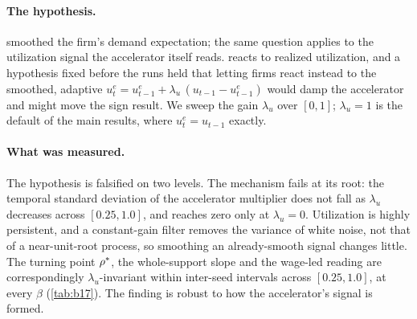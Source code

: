 \paragraph{The hypothesis.}  smoothed the firm's demand
expectation; the same question applies to the utilization signal the accelerator
itself reads.  reacts to realized utilization, and a
hypothesis fixed before the runs held that letting firms react instead to the
smoothed, adaptive $u^e_t = u^e_{t-1} + \lambda_u\,(u_{t-1} - u^e_{t-1})$ would
damp the accelerator and might move the sign result. We sweep the gain
$\lambda_u$ over $[0, 1]$; $\lambda_u = 1$ is the default of the main results,
where $u^e_t = u_{t-1}$ exactly.

\paragraph{What was measured.} The hypothesis is falsified on two levels. The
mechanism fails at its root: the temporal standard deviation of the accelerator
multiplier does not fall as $\lambda_u$ decreases across $[0.25, 1.0]$, and
reaches zero only at $\lambda_u = 0$. Utilization is highly persistent, and a
constant-gain filter removes the variance of white noise, not that of a
near-unit-root process, so smoothing an already-smooth signal changes little.
The turning point $\rho^{\ast}$, the whole-support slope and the wage-led reading
are correspondingly $\lambda_u$-invariant within inter-seed intervals across
$[0.25, 1.0]$, at every $\beta$ (\cref{tab:b17}). The finding is robust to how
the accelerator's signal is formed.

